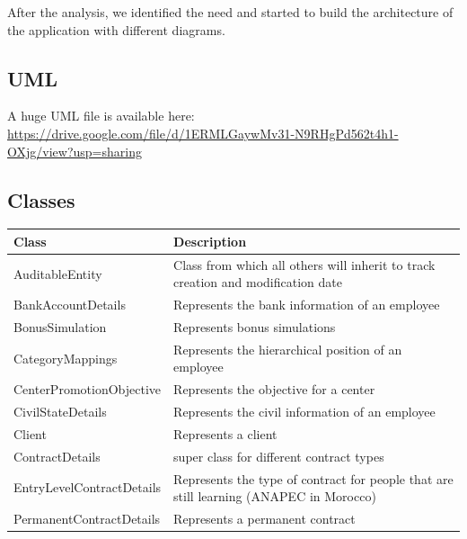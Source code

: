 \documentclass[12pt,a4paper,table,english]{article}
\begin{document}
	After the analysis, we identified the need and started to build the architecture of the application with different diagrams.
	
	\subsection{UML}	
	A huge UML file is available here: \url{https://drive.google.com/file/d/1ERMLGaywMv31-N9RHgPd562t4h1-OXjg/view?usp=sharing}
	
	\subsection{Classes}
	\begin{center}
		\renewcommand{\arraystretch}{1.5} %
		\begin{tabularx}{\textwidth}{| l | X |}
			\hline
			\textbf{Class} & \textbf{Description} \\\hline
			
			AuditableEntity & Class from which all others will inherit to track creation and modification date\\\hline
			
			BankAccountDetails & Represents the bank information of an employee\\\hline
			
			BonusSimulation & Represents bonus simulations \\\hline
			
			CategoryMappings & Represents the hierarchical position of an employee\\\hline
			
			CenterPromotionObjective & Represents the objective for a center\\\hline
			
			CivilStateDetails & Represents the civil information of an employee\\\hline
			
			Client & Represents a client\\\hline
		
			ContractDetails & super class for different contract types\\\hline
		
			EntryLevelContractDetails & Represents the type of contract for people that are still learning (ANAPEC in Morocco) \\\hline
			
			PermanentContractDetails & Represents a permanent contract \\\hline
			

\end{tabularx}
\end{center}
\end{document}

